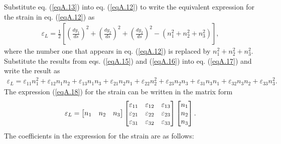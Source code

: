 \documentclass{AeroStructure-ERJohnson}
\begin{document}
Substitute eq. (\ref{eqA.13}) into eq. (\ref{eqA.12}) to write the equivalent expression for the strain in eq. (\ref{eqA.12}) as
\begin{align}\label{eqA.17}
\varepsilon_{L}=\frac{1}{2}\left[\left(\frac{d y_{1}}{d s}\right)^{2}+\left(\frac{d y_{2}}{d s}\right)^{2}+\left(\frac{d y_{2}}{d s}\right)^{2}-\left(n_{1}^{2}+n_{2}^{2}+n_{3}^{2}\right)\right],
\end{align}
where the number one that appears in eq. (\ref{eqA.12}) is replaced by $n_{1}^{2}+n_{2}^{2}+n_{3}^{2}$. Substitute the results from eqs. (\ref{eqA.15}) and (\ref{eqA.16}) into eq. (\ref{eqA.17}) and write the result as
\begin{align}\label{eqA.18}
\varepsilon_{L}=\varepsilon_{11} n_{1}^{2}+\varepsilon_{12} n_{1} n_{2}+\varepsilon_{13} n_{1} n_{3}+\varepsilon_{21} n_{2} n_{1}+\varepsilon_{22} n_{2}^{2}+\varepsilon_{23} n_{2} n_{3}+\varepsilon_{31} n_{3} n_{1}+\varepsilon_{32} n_{3} n_{2}+\varepsilon_{33} n_{3}^{2}.
\end{align}
The expression (\ref{eqA.18}) for the strain can be written in the matrix form
\begin{align}\label{eqA.19}
\varepsilon_{L}=\left[\begin{array}{@{}lll@{}}n_{1} & n_{2} & n_{3}\end{array}\right]\left[\begin{array}{@{}lll@{}}\varepsilon_{11} & \varepsilon_{12} & \varepsilon_{13} \\\varepsilon_{21} & \varepsilon_{22} & \varepsilon_{23} \\\varepsilon_{31} & \varepsilon_{32} & \varepsilon_{33}\end{array}\right]\left[\begin{array}{@{}c@{}}n_{1} \\n_{2} \\n_{3}\end{array}\right].
\end{align}
The coefficients in the expression for the strain  are as follows:
\end{document}
